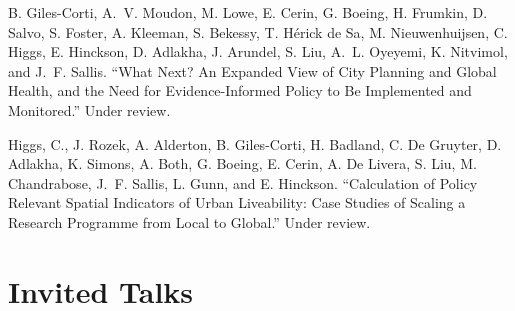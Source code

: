 \documentclass[12pt,letterpaper]{report}
\begin{document}
\begin{tablist}
    \item[\the\year] \tab{}B. Giles-Corti, A.~V. Moudon, M. Lowe, E. Cerin, G. Boeing, H. Frumkin, D. Salvo, S. Foster, A. Kleeman, S. Bekessy, T. Hérick de Sa, M. Nieuwenhuijsen, C. Higgs, E. Hinckson, D. Adlakha, J. Arundel, S. Liu, A.~L. Oyeyemi, K. Nitvimol, and J.~F. Sallis. \enquote{What Next? An Expanded View of City Planning and Global Health, and the Need for Evidence-Informed Policy to Be Implemented and Monitored.} Under review.

    \item[\the\year] \tab{}Higgs, C., J. Rozek, A. Alderton, B. Giles-Corti, H. Badland, C. De Gruyter, D. Adlakha, K. Simons, A. Both, G. Boeing, E. Cerin, A. De Livera, S. Liu, M. Chandrabose, J.~F. Sallis, L. Gunn, and E. Hinckson. \enquote{Calculation of Policy Relevant Spatial Indicators of Urban Liveability: Case Studies of Scaling a Research Programme from Local to Global.} Under review.

    \end{tablist}



    \section*{Invited Talks}
\end{document}
